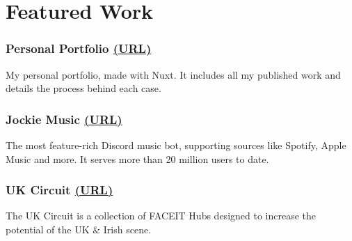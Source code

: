 \section*{Featured Work}
%
%
%
\subsubsection*{\large
  {\blackColor Personal Portfolio}
  \small
  \href{https://bumbleboss.xyz/}{(URL)}
}
My personal portfolio, made with Nuxt. It includes all my published work and details the process behind each case.
%
%
\subsubsection*{\large
  {\blackColor Jockie Music}
  \small
  \href{https://bumbleboss.xyz/w/jockiemusic}{(URL)}
}
The most feature-rich Discord music bot, supporting sources like Spotify, Apple Music and more. It serves more than 20 million users to date.
%
%
\subsubsection*{\large
  {\blackColor UK Circuit}
  \small
  \href{https://bumbleboss.xyz/w/uk-circuit}{(URL)}
}
The UK Circuit is a collection of FACEIT Hubs designed to increase the potential of the UK \& Irish scene.